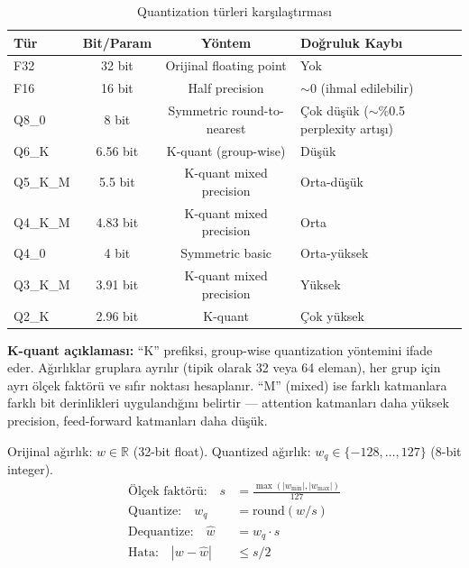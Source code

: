 \begin{table}[H]
\centering
\caption{Quantization t\"{u}rleri kar\c{s}{\i}la\c{s}t{\i}rmas{\i}}
\label{tab:quant-types}
\begin{tabularx}{\textwidth}{lccX}
\toprule
\color{chapterBlue}\textbf{T\"{u}r} &
\color{chapterBlue}\textbf{Bit/Param} &
\color{chapterBlue}\textbf{Y\"{o}ntem} &
\color{chapterBlue}\textbf{Do\u{g}ruluk Kayb{\i}} \\
\midrule
F32  & 32 bit  & Orijinal floating point & Yok \\
F16  & 16 bit  & Half precision & $\sim$0 (ihmal edilebilir) \\
Q8\_0 & 8 bit  & Symmetric round-to-nearest & \c{C}ok d\"{u}\c{s}\"{u}k ($\sim$\%0.5 perplexity art{\i}\c{s}{\i}) \\
Q6\_K & 6.56 bit & K-quant (group-wise) & D\"{u}\c{s}\"{u}k \\
Q5\_K\_M & 5.5 bit & K-quant mixed precision & Orta-d\"{u}\c{s}\"{u}k \\
Q4\_K\_M & 4.83 bit & K-quant mixed precision & Orta \\
Q4\_0 & 4 bit  & Symmetric basic & Orta-y\"{u}ksek \\
Q3\_K\_M & 3.91 bit & K-quant mixed precision & Y\"{u}ksek \\
Q2\_K & 2.96 bit & K-quant & \c{C}ok y\"{u}ksek \\
\bottomrule
\end{tabularx}
\end{table}

\textbf{K-quant a\c{c}{\i}klamas{\i}:} ``K'' prefiksi, group-wise quantization y\"{o}ntemini ifade eder. A\u{g}{\i}rl{\i}klar gruplara ayr{\i}l{\i}r (tipik olarak 32 veya 64 eleman), her grup i\c{c}in ayr{\i} \"{o}l\c{c}ek fakt\"{o}r\"{u} ve s{\i}f{\i}r noktas{\i} hesaplan{\i}r. ``M'' (mixed) ise farkl{\i} katmanlara farkl{\i} bit derinlikleri uyguland{\i}\u{g}{\i}n{\i} belirtir --- attention katmanlar{\i} daha y\"{u}ksek precision, feed-forward katmanlar{\i} daha d\"{u}\c{s}\"{u}k.

\begin{formulbox}
Orijinal a\u{g}{\i}rl{\i}k: $w \in \mathbb{R}$ (32-bit float). Quantized a\u{g}{\i}rl{\i}k: $w_q \in \{-128, \ldots, 127\}$ (8-bit integer).
\begin{align}
\text{\"{O}l\c{c}ek fakt\"{o}r\"{u}:} \quad s &= \frac{\max(|w_{\min}|, |w_{\max}|)}{127} \label{eq:quant-scale} \\
\text{Quantize:} \quad w_q &= \mathrm{round}(w / s) \label{eq:quantize} \\
\text{Dequantize:} \quad \hat{w} &= w_q \cdot s \label{eq:dequantize} \\
\text{Hata:} \quad |w - \hat{w}| &\leq s/2 \label{eq:quant-error}
\end{align}
\end{formulbox}


